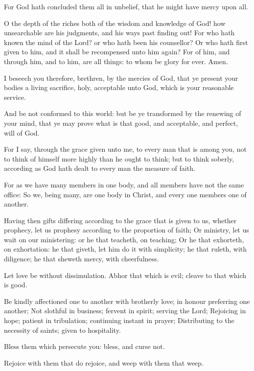 \Verse For God hath concluded them all in unbelief, that he might have mercy upon all.

\Verse O the depth of the riches both of the wisdom and knowledge of God!  how unsearchable are his judgments, and his ways past finding out!  \Verse For who hath known the mind of the Lord? or who hath been his counsellor?  \Verse Or who hath first given to him, and it shall be recompensed unto him again?  \Verse For of him, and through him, and to him, are all things: to whom be glory for ever. Amen.


\Chapter
\Verse I beseech you therefore, brethren, by the mercies of God, that ye present your bodies a living sacrifice, holy, acceptable unto God, which is your reasonable service.

\Verse And be not conformed to this world: but be ye transformed by the renewing of your mind, that ye may prove what is that good, and acceptable, and perfect, will of God.

\Verse For I say, through the grace given unto me, to every man that is among you, not to think of himself more highly than he ought to think; but to think soberly, according as God hath dealt to every man the measure of faith.

\Verse For as we have many members in one body, and all members have not the same office: \Verse So we, being many, are one body in Christ, and every one members one of another.

\Verse Having then gifts differing according to the grace that is given to us, whether prophecy, let us prophesy according to the proportion of faith; \Verse Or ministry, let us wait on our ministering: or he that teacheth, on teaching; \Verse Or he that exhorteth, on exhortation: he that giveth, let him do it with simplicity; he that ruleth, with diligence; he that sheweth mercy, with cheerfulness.

\Verse Let love be without dissimulation. Abhor that which is evil; cleave to that which is good.

\Verse Be kindly affectioned one to another with brotherly love; in honour preferring one another; \Verse Not slothful in business; fervent in spirit; serving the Lord; \Verse Rejoicing in hope; patient in tribulation; continuing instant in prayer; \Verse Distributing to the necessity of saints; given to hospitality.

\Verse Bless them which persecute you: bless, and curse not.

\Verse Rejoice with them that do rejoice, and weep with them that weep.

